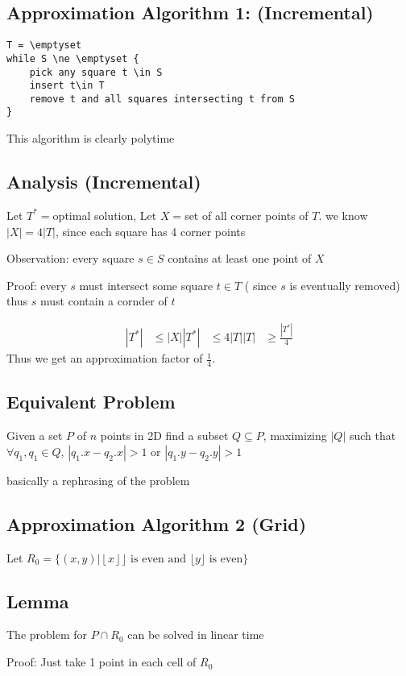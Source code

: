 \documentclass[english,12pt]{article}
\theoremstyle{plain}
\theoremstyle{definition}
\theoremstyle{definition} %
\newcommand{\floor}[1]{\left\lfloor #1 \right\rfloor}
\begin{document}
\subsection{Approximation Algorithm 1: (Incremental)}
\begin{verbatim}
T = \emptyset
while S \ne \emptyset {
    pick any square t \in S
    insert t\in T
    remove t and all squares intersecting t from S
}
\end{verbatim}
This algorithm is clearly polytime

\subsection{Analysis (Incremental)}
Let $T^\ast=$optimal solution, Let $X=$set of all corner points of $T$.  we know $|X|=4|T|$, since each square has 4 corner points

Observation: every square $s\in S$ contains at least one point of $X$

Proof: every $s$ must intersect some square $t\in T$ ( since $s$ is eventually removed)  thus $s$ must contain a cornder of $t$

\begin{align*}
|T^\ast|&\le |X|
|T^\ast|&\le 4|T|
|T|&\ge \frac{|T^\ast|}{4}
\end{align*}
Thus we get an approximation factor of $\frac{1}{4}$.

\subsection{Equivalent Problem}
Given a set $P$ of $n$ points in 2D find a subset $Q\subseteq P$, maximizing $|Q|$ such that $\forall q_1, q_1\in Q$, $|q_1.x-q_2.x|>1$ or $|q_1.y-q_2.y|>1$

basically a rephrasing of the problem

\subsection{Approximation Algorithm 2 (Grid)}

Let $R_0=\{(x, y)|\floor x\rfloor \text{ is even and }\lfloor y\rfloor \text{ is even}\}$

\subsection{Lemma}
The problem for $P\cap R_0$ can be solved in linear time

Proof: Just take 1 point in each cell of $R_0$
\end{document}
